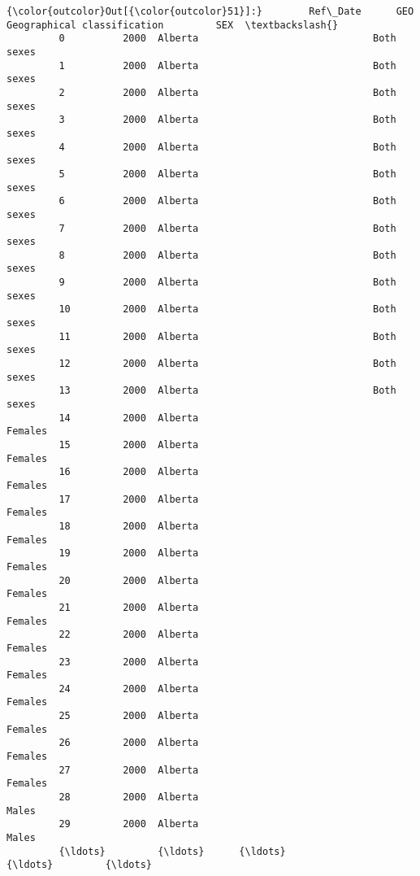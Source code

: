 \documentclass[11pt]{article}
\begin{document}
\begin{Verbatim}[commandchars=\\\{\}]
{\color{outcolor}Out[{\color{outcolor}51}]:}        Ref\_Date      GEO Geographical classification         SEX  \textbackslash{}
         0          2000  Alberta                              Both sexes   
         1          2000  Alberta                              Both sexes   
         2          2000  Alberta                              Both sexes   
         3          2000  Alberta                              Both sexes   
         4          2000  Alberta                              Both sexes   
         5          2000  Alberta                              Both sexes   
         6          2000  Alberta                              Both sexes   
         7          2000  Alberta                              Both sexes   
         8          2000  Alberta                              Both sexes   
         9          2000  Alberta                              Both sexes   
         10         2000  Alberta                              Both sexes   
         11         2000  Alberta                              Both sexes   
         12         2000  Alberta                              Both sexes   
         13         2000  Alberta                              Both sexes   
         14         2000  Alberta                                 Females   
         15         2000  Alberta                                 Females   
         16         2000  Alberta                                 Females   
         17         2000  Alberta                                 Females   
         18         2000  Alberta                                 Females   
         19         2000  Alberta                                 Females   
         20         2000  Alberta                                 Females   
         21         2000  Alberta                                 Females   
         22         2000  Alberta                                 Females   
         23         2000  Alberta                                 Females   
         24         2000  Alberta                                 Females   
         25         2000  Alberta                                 Females   
         26         2000  Alberta                                 Females   
         27         2000  Alberta                                 Females   
         28         2000  Alberta                                   Males   
         29         2000  Alberta                                   Males   
         {\ldots}         {\ldots}      {\ldots}                         {\ldots}         {\ldots}   

\end{Verbatim}
\end{document}
